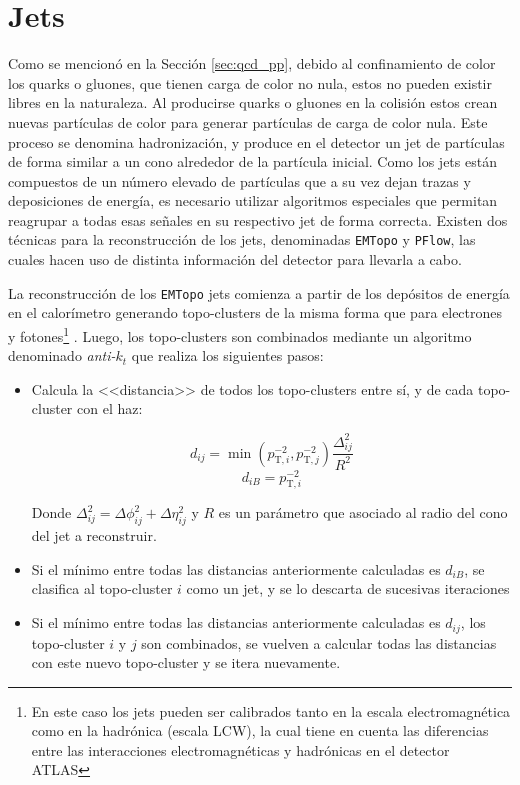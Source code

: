 \section{Jets}

Como se mencionó en la Sección \ref{sec:qcd_pp}, debido al confinamiento de color los quarks o gluones, que tienen carga de color no nula, estos no pueden existir libres en la naturaleza. Al producirse quarks o gluones en la colisión estos crean nuevas partículas de color para generar partículas de carga de color nula. Este proceso se denomina hadronización, y produce en el detector un jet de partículas de forma similar a un cono alrededor de la partícula inicial. Como los jets están compuestos de un número elevado de partículas que a su vez dejan trazas y deposiciones de energía, es necesario utilizar algoritmos especiales que permitan reagrupar a todas esas señales en su respectivo jet de forma correcta. Existen dos técnicas para la reconstrucción de los jets, denominadas \texttt{EMTopo} y \texttt{PFlow}, las cuales hacen uso de distinta información del detector para llevarla a cabo. 

La reconstrucción de los \texttt{EMTopo} jets comienza a partir de los depósitos de energía en el calorímetro generando topo-clusters de la misma forma que para electrones y fotones\footnote{En este caso los jets pueden ser calibrados tanto en la escala electromagnética como en la hadrónica (escala LCW), la cual tiene en cuenta las diferencias entre las interacciones electromagnéticas y hadrónicas en el detector ATLAS} \cite{Lampl:1099735}. Luego, los topo-clusters son combinados mediante un algoritmo denominado \textit{anti-$k_t$} \cite{Cacciari:2008gp} que realiza los siguientes pasos:

\begin{itemize}
	\item Calcula la <<distancia>> de todos los topo-clusters entre sí, y de cada topo-cluster con el haz:

	\begin{equation}
		d_{ij} = \min(p_{\text{T},i}^{-2}, p_{\text{T},j}^{-2})\frac{\Delta_{ij}^{2}}{R^{2}}
	\end{equation}
	\begin{equation}
		d_{iB} = p_{\text{T},i}^{-2}
	\end{equation}

	Donde $\Delta_{ij}^{2} = \Delta\phi_{ij}^{2} + \Delta\eta_{ij}^{2}$ y $R$ es un parámetro que asociado al radio del cono del jet a reconstruir.

	\item Si el mínimo entre todas las distancias anteriormente calculadas es $d_{iB}$, se clasifica al topo-cluster $i$ como un jet, y se lo descarta de sucesivas iteraciones

	\item Si el mínimo entre todas las distancias anteriormente calculadas es $d_{ij}$, los topo-cluster $i$ y $j$ son combinados, se vuelven a calcular todas las distancias con este nuevo topo-cluster y se itera nuevamente.

\end{itemize}

